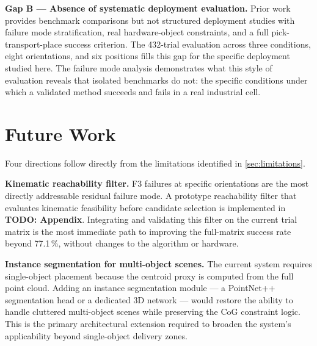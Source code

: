 \documentclass[12pt, a4paper]{report}
\begin{document}
\textbf{Gap B --- Absence of systematic deployment evaluation.} Prior work provides benchmark comparisons but not structured deployment studies with failure mode stratification, real hardware-object constraints, and a full pick-transport-place success criterion. The 432-trial evaluation across three conditions, eight orientations, and six positions fills this gap for the specific deployment studied here. The failure mode analysis demonstrates what this style of evaluation reveals that isolated benchmarks do not: the specific conditions under which a validated method succeeds and fails in a real industrial cell.

\section{Future Work}

Four directions follow directly from the limitations identified in \cref{sec:limitations}.

\textbf{Kinematic reachability filter.} F3 failures at specific orientations are the most directly addressable residual failure mode. A prototype reachability filter that evaluates kinematic feasibility before candidate selection is implemented in \textbf{TODO: Appendix}. Integrating and validating this filter on the current trial matrix is the most immediate path to improving the full-matrix success rate beyond 77.1\,\%, without changes to the algorithm or hardware.


\textbf{Instance segmentation for multi-object scenes.} The current system requires single-object placement because the centroid proxy is computed from the full point cloud. Adding an instance segmentation module --- a PointNet++~\cite{qi2017pointnet2} segmentation head or a dedicated 3D network --- would restore the ability to handle cluttered multi-object scenes while preserving the CoG constraint logic. This is the primary architectural extension required to broaden the system's applicability beyond single-object delivery zones.
\end{document}
